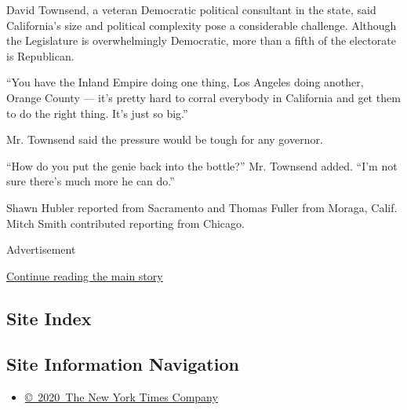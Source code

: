 David Townsend, a veteran Democratic political consultant in the state,
said California's size and political complexity pose a considerable
challenge. Although the Legislature is overwhelmingly Democratic, more
than a fifth of the electorate is Republican.

``You have the Inland Empire doing one thing, Los Angeles doing another,
Orange County --- it's pretty hard to corral everybody in California and
get them to do the right thing. It's just so big.''

Mr. Townsend said the pressure would be tough for any governor.

``How do you put the genie back into the bottle?'' Mr. Townsend added.
``I'm not sure there's much more he can do.''

Shawn Hubler reported from Sacramento and Thomas Fuller from Moraga,
Calif. Mitch Smith contributed reporting from Chicago.

Advertisement

\protect\hyperlink{after-bottom}{Continue reading the main story}

\hypertarget{site-index}{%
\subsection{Site Index}\label{site-index}}

\hypertarget{site-information-navigation}{%
\subsection{Site Information
Navigation}\label{site-information-navigation}}

\begin{itemize}
\tightlist
\item
  \href{https://help.nytimes.com/hc/en-us/articles/115014792127-Copyright-notice}{©~2020~The
  New York Times Company}
\end{itemize}

